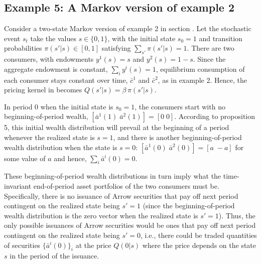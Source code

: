 \subsection{Example 5: A Markov version of 
                           example 2}\label{sec:example5}%
Consider a two-state Markov version of example 2 in 
section .
Let the stochastic event $s_t$ take the values 
$s\in\{0,1\}$, 
with the initial state $s_0=1$ and transition 
probabilities $\pi(s'\vert s)\in [0,1]$
satisfying $\sum_{s'} \pi(s'\vert s)=1$.
There are two consumers, with endowments $y^1(s)=s$ and 
$y^2(s)=1-s$. Since the aggregate endowment is constant,
$\sum_i y^i(s)=1$, equilibrium consumption of each
consumer stays constant over time, 
$\bar c^1$ and $\bar c^2$, as in example 2. Hence, 
the pricing kernel in  becomes
$Q(s'|s) = \beta \,\pi(s'|s)$.

In period 0 when the initial state is $s_0=1$, the 
consumers start with no beginning-of-period wealth, 
$[\bar a^1(1)\; \bar a^2(1)] = [0\; 0]$.
According to proposition 5, this initial wealth
distribution will prevail at the beginning of
a period whenever the realized state is $s=1$, and 
there is another beginning-of-period wealth
distribution when the state is $s=0$:
$[\bar a^1(0)\; \bar a^2(0)] = [a\; -\!a]$ 
for some value of $a$ and hence,
$\sum_{i} \bar a^i(0) =0$.

These beginning-of-period wealth distributions in
turn imply what the time-invariant end-of-period 
asset portfolios of the two consumers must be. 
Specifically, there is no issuance of Arrow
securities that pay off next period contingent on 
the realized state being $s'=1$ (since the 
beginning-of-period wealth distribution is the 
zero vector when the realized state is $s'=1$).
Thus, the only possible issuances of Arrow
securities would be ones that pay off next period
contingent on the realized state being $s'=0$,
i.e., there could be traded quantities of 
securities $\{\bar a^i(0)\}_i$ at the price 
$Q(0 | s)$ where the price depends on the 
state $s$ in the period of the issuance.

